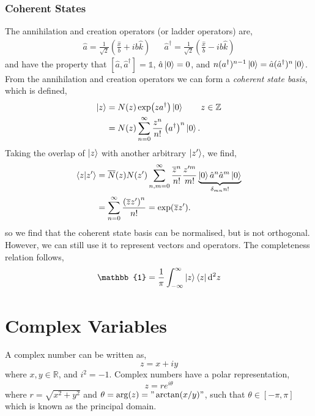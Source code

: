 \documentclass{book}
\renewcommand{\braket}[2]{\langle#1|#2\rangle}
\begin{document}
\subsection{Coherent States}
The annihilation and creation operators (or ladder operators) are,
\begin{align}
	\hat{a} = \frac{1}{\sqrt{2}}\left(\frac{\hat{x}}{b} + ib\hat{k}\right) && \hat{a}^{\dag} = \frac{1}{\sqrt{2}}\left(\frac{\hat{x}}{b} - ib\hat{k}\right)
\end{align}
and have the property that $\left[\hat{a},\hat{a}^{\dag}\right] = \mathbb{1}$, $\hat{a}\ket{0} = 0$, and $n(a^{\dag})^{n-1}\ket{0} = \hat{a}(\hat{a}^{\dag})^n\ket{0}$. From the annihilation and creation operators we can form a \textit{coherent state basis}, which is defined,
\begin{equation}
	\begin{split}
	\ket{z} & = N(z)\exp(za^{\dag})\ket{0} \hspace{2em} z \in \mathbb{Z} \\
	& = N(z) \sum_{n=0}^{\infty}\frac{z^n}{n!}\left(a^{\dag}\right)^n\ket{0}.
	\end{split}
\end{equation}
Taking the overlap of $\ket{z}$ with another arbitrary $\ket{z'}$, we find,
\begin{equation}
	\begin{split}
		\braket{z}{z'} & = \overline{N}(z)N(z')\sum_{n,m=0}^{\infty}\frac{\overline{z}^n}{n!}\frac{z'^m}{m!}\underbrace{\ket{0}\hat{a}^n\hat{a}^m\ket{0}}_{\delta_{mn}n!} \\
		 & = \sum_{n=0}^{\infty}\frac{\left(\overline{z}z'\right)^n}{n!} = \exp(\overline{z}z').
	\end{split}
\end{equation}
so we find that the coherent state basis can be normalised, but is not orthogonal. However, we can still use it to represent vectors and operators. The completeness relation follows,
\begin{equation}
	\mathbb{1} = \frac{1}{\pi}\int_{-\infty}^{\infty}\ket{z}\bra{z}\dd^2z
\end{equation}
\chapter{Complex Variables}
A complex number can be written as,
\begin{equation}
	z = x + iy
\end{equation}
where $x,y \in \mathbb{R}$, and $i^2 = -1$. Complex numbers have a polar representation,
\begin{equation}
	z = re^{i\theta}
\end{equation} 
where $r = \sqrt{x^2 + y^2}$ and $\theta = \arg(z) = "\arctan(x/y)"$, such that $\theta \in \left[-\pi, \pi\right]$ which is known as the principal domain.
\end{document}
